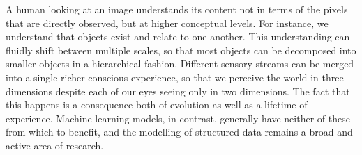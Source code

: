 %
%
%

A human looking at an image understands its content not in terms of the pixels that are directly observed, but at higher conceptual levels.
For instance, we understand that objects exist and relate to one another. 
This understanding can fluidly shift between multiple scales, so that most objects can be decomposed into smaller objects in a hierarchical fashion. 
Different sensory streams can be merged into a single richer conscious experience, so that we perceive the world in three dimensions despite each of our eyes seeing only in two dimensions. 
The fact that this happens is a consequence both of evolution as well as a lifetime of experience.
Machine learning models, in contrast, generally have neither of these from which to benefit,
and the modelling of structured data remains a broad and active area of research.

